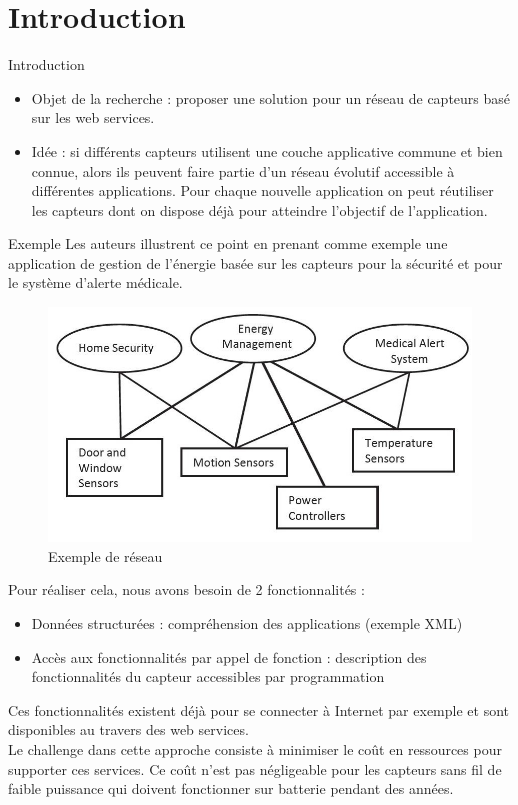 
\section{Introduction}
\begin{frame}{Introduction}
\begin{itemize}
\item Objet de la recherche : proposer une solution pour un réseau de capteurs basé sur les web services. 

\item Idée : si différents capteurs utilisent une couche applicative commune et bien connue, alors ils peuvent faire partie d'un réseau évolutif accessible à différentes applications. Pour chaque nouvelle application on peut réutiliser les capteurs dont on dispose déjà pour atteindre l'objectif de l'application.
\end{itemize}
\end{frame}

\begin{frame}{Exemple}
Les auteurs illustrent ce point en prenant comme exemple une application de gestion de l'énergie basée sur les capteurs pour la sécurité et pour le système d'alerte médicale. 
\begin{figure}
  \centering
  \includegraphics[scale=0.4]{figures/exemple.jpg}
  \caption{Exemple de réseau}
 \end{figure} 
\end{frame}


\begin{frame}
Pour réaliser cela, nous avons besoin de 2 fonctionnalités :
\begin{itemize}
\item Données structurées : compréhension des applications (exemple XML)
\item Accès aux fonctionnalités par appel de fonction : description des fonctionnalités du capteur accessibles par programmation
\end{itemize}
Ces fonctionnalités existent déjà pour se connecter à Internet par exemple et sont disponibles au travers des web services.\\ Le challenge dans cette approche consiste à minimiser le coût en ressources pour supporter ces services. Ce coût n'est pas négligeable pour les capteurs sans fil de faible puissance qui doivent fonctionner sur batterie pendant des années.
\end{frame}

